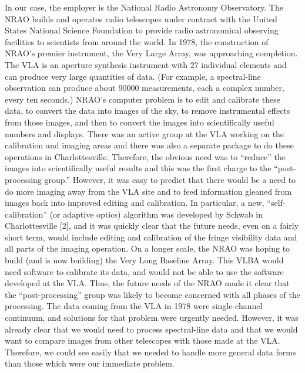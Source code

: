      In our case, the employer is the National Radio Astronomy Observatory.
The NRAO builds and operates radio telescopes under contract with the
United States National Science Foundation to provide radio astronomical
observing facilities to scientists from around the world.  In 1978, the
construction of NRAO's premier instrument, the Very Large Array, was
approaching completion.  The VLA is an aperture synthesis instrument
with 27 individual elements and can produce very large quantities of
data.  (For example, a spectral-line observation can produce about
90000 measurements, each a complex number, every ten seconds.)
NRAO's computer problem is to edit and calibrate these data, to
convert the data into images of the sky, to remove instrumental
effects from those images, and then to convert the images into
scientifically useful numbers and displays.  There was an active
group at the VLA working on the calibration and imaging areas and
there was also a separate package to do these operations in
Charlottesville.  Therefore, the obvious need was to ``reduce'' the images
into scientifically useful results and this was the first charge to the
``post-processing group.''  However, it was easy to predict that there
would be a need to do more imaging away from the VLA site and to feed
information gleaned from images back into improved editing and calibration.
In particular, a new, ``self-calibration'' (or adaptive optics) algorithm
was developed by Schwab in Charlottesville [2], and it was quickly clear that
the future needs, even on a fairly short term, would include editing and
calibration of the fringe visibility data and all parts of the imaging
operation.  On a longer scale, the NRAO was hoping to build (and is now
building) the Very Long Baseline Array.  This VLBA would need software
to calibrate its data, and would not be able to use the software developed
at the \hbox{VLA}.  Thus, the future needs of the NRAO made it clear
that the ``post-processing'' group was likely to become concerned with
all phases of the processing.  The data coming from the VLA in 1978 were
single-channel continuum, and solutions for that problem were
urgently needed.  However, it was already clear that we would need to
process spectral-line data and that we would want to compare images from
other telescopes with those made at the \hbox{VLA}.  Therefore, we could
see easily that we needed to handle more general data forms than
those which were our immediate problem.

